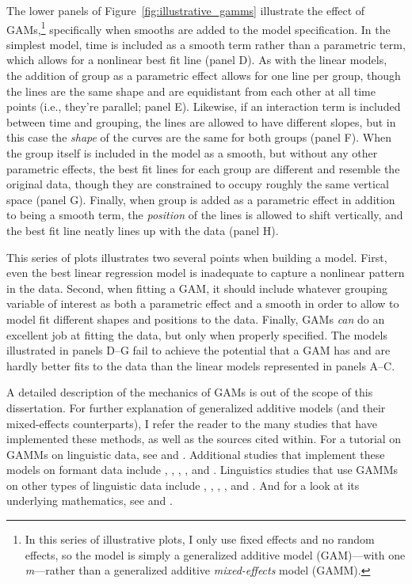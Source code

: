 The lower panels of Figure~\ref{fig:illustrative_gamms} illustrate the effect of GAMs,\footnote{In this series of illustrative plots, I only use fixed effects and no random effects, so the model is simply a generalized additive model (GAM)---with one \textit{m}---rather than a generalized additive \textit{mixed-effects} model (GAMM).} specifically when smooths are added to the model specification. In the simplest model, time is included as a smooth term rather than a parametric term, which allows for a nonlinear best fit line (panel D). As with the linear models, the addition of group as a parametric effect allows for one line per group, though the lines are the same shape and are equidistant from each other at all time points (i.e., they’re parallel; panel E). Likewise, if an interaction term is included between time and grouping, the lines are allowed to have different slopes, but in this case the \textit{shape} of the curves are the same for both groups (panel F). When the group itself is included in the model as a smooth, but without any other parametric effects, the best fit lines for each group are different and resemble the original data, though they are constrained to occupy roughly the same vertical space (panel G). Finally, when group is added as a parametric effect in addition to being a smooth term, the \textit{position} of the lines is allowed to shift vertically, and the best fit line neatly lines up with the data (panel H).

This series of plots illustrates two several points when building a model. First, even the best linear regression model is inadequate to capture a nonlinear pattern in the data. Second, when fitting a GAM, it should include whatever grouping variable of interest as both a parametric effect and a smooth in order to allow to model fit different shapes and positions to the data. Finally, GAMs \textit{can} do an excellent job at fitting the data, but only when properly specified. The models illustrated in panels D--G fail to achieve the potential that a GAM has and are hardly better fits to the data than the linear models represented in panels A--C.

A detailed description of the mechanics of GAMs is out of the scope of this dissertation. For further explanation of generalized additive models (and their mixed-effects counterparts), I refer the reader to the many studies that have implemented these methods, as well as the sources cited within. For a tutorial on GAMMs on linguistic data, see \citet{soskuthy_2017} and \citet{wieling_2018}. Additional studies that implement these models on formant data include \citet{fruehwald_2017}, \citet{renwick_stanley_2020}, \citet{soskuthy_etal_2018}, \citet{warburton_2018}, and \citet{gahl_baayen_2019}. Linguistics studies that use GAMMs on other types of linguistic data include \citet{vanhofwegen_2017_diss}, \citet{kosling_etal_2013}, \citet{tomaschek_etal_2018_phonetics, tomaschek_etal_2018_vanguard}, \citet{strycharczuk_scobbie_2017}, and \citet{mielke_etal_2017}. And for a look at its underlying mathematics, see \citet{faraway_2016} and \citet{wood_2017}.

